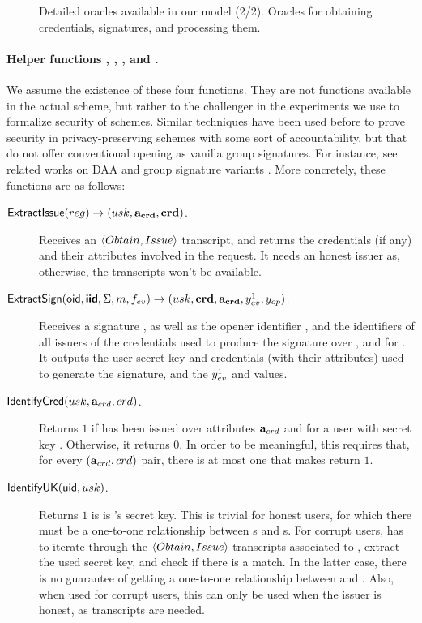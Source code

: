 {\begin{figure*}[htp!]
{\begin{minipage}[t]{.5\textwidth}
      \end{minipage}
      
    }

    \caption{Detailed oracles available in our model (2/2). Oracles for
      obtaining credentials, signatures, and processing them.}
    \label{fig:oracles2}
  \end{figure*}
}

\paragraph{Helper functions \ExtractIssue, \ExtractSign, \IdentifyCred, and
  \IdentifyUK.} We assume the existence of these four functions. They are not
functions available in the actual scheme, but rather to the challenger in the
experiments we use to formalize security of \UAS schemes. Similar techniques
have been used before to prove security in privacy-preserving schemes with some
sort of accountability, but that do not offer conventional opening as vanilla
group signatures. For instance, see related works on DAA \cite{bfg+11,cdl16} and
group signature variants \cite{dl21,fgl21,gl19,lnpy21}. More concretely, these
functions are as follows:

\begin{description}
\item[$\mathsf{ExtractIssue}(reg) \rightarrow (usk,\mathbf{a}_{\mathbf{crd}},\mathbf{crd})$.]
  Receives an $\langle Obtain, Issue \rangle$ transcript, and returns the
  credentials (if any) and their attributes involved in the request. It 
  needs an honest issuer as, otherwise, the transcripts won't be available.
\item[$\mathsf{ExtractSign}(\mathsf{oid},\boldsymbol{\mathsf{\mathsf{iid}}},\Sigma,m,f_{ev}) \rightarrow (usk,
  \mathbf{crd},\mathbf{a}_{\mathbf{crd}},y_{ev}^1,y_{op})$.] Receives a signature \Sig,
  as well as the opener identifier \oid, and the identifiers of all issuers of
  the credentials used to produce the signature over \msg, and for \feval.
  It outputs the user secret key and credentials (with their attributes) used to
  generate the signature, and the $y_{ev}^1$ and \yinsp values.
\item[$\mathsf{IdentifyCred}(usk,\mathbf{a}_{crd},crd)$.] Returns $1$ if \cred has been
  issued over attributes $\mathbf{a}_{crd}$ and for a user with secret key \usk.
  Otherwise, it returns $0$. In order to be meaningful, this requires that,
  for every $(\mathbf{a}_{crd},crd)$ pair, there is at most one \usk that makes
  \IdentifyCred return $1$.
\item[$\mathsf{IdentifyUK}(\mathsf{uid},usk)$.] Returns $1$ is \usk is {\uid}'s secret key.
  This is trivial for honest users, for which there must be a one-to-one
  relationship between {\uid}s and {\usk}s. For corrupt users, \IdentifyUK has
  to iterate through the $\langle Obtain,Issue\rangle$ transcripts associated
  to \uid, extract the used secret key, and check if there is a match. In the
  latter case, there is no guarantee of getting a one-to-one relationship
  between \usk and \uid. Also, when used for corrupt users, this can only be
  used when the issuer is honest, as transcripts are needed. 
\end{description}

